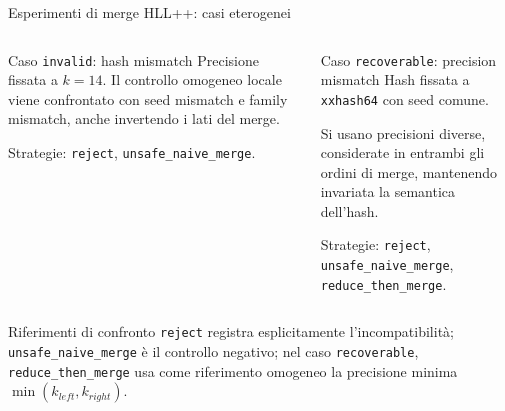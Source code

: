 \documentclass[aspectratio=169,11pt]{beamer}
\begin{document}
\begin{frame}{Esperimenti di merge HLL++: casi eterogenei}
  \begin{columns}[T,onlytextwidth]
      \begin{block}{Caso \texttt{invalid}: hash mismatch}
        \footnotesize
        Precisione fissata a \(k=14\). Il controllo omogeneo locale viene
        confrontato con seed mismatch e family mismatch, anche invertendo i lati
        del merge.

        Strategie: \texttt{reject}, \texttt{unsafe\_naive\_merge}.
      \end{block}
      \begin{block}{Caso \texttt{recoverable}: precision mismatch}
        \footnotesize
        Hash fissata a \texttt{xxhash64} con seed comune.

        Si usano precisioni diverse, considerate in entrambi gli ordini di
        merge, mantenendo invariata la semantica dell'hash.

        Strategie: \texttt{reject}, \texttt{unsafe\_naive\_merge},
        \texttt{reduce\_then\_merge}.
      \end{block}
  \end{columns}

  \vspace{0.15cm}

  \begin{alertblock}{Riferimenti di confronto}
    \footnotesize
    \texttt{reject} registra esplicitamente l'incompatibilit\`a;
    \texttt{unsafe\_naive\_merge} \`e il controllo negativo; nel caso
    \texttt{recoverable}, \texttt{reduce\_then\_merge} usa come riferimento
    omogeneo la precisione minima \(\min(k_{left},k_{right})\).
  \end{alertblock}
\end{frame}
\end{document}
